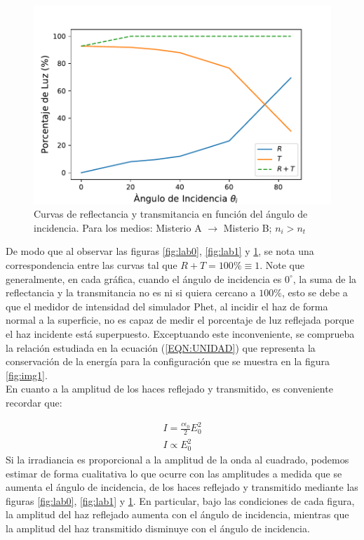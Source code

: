 \documentclass[
aps,
reprint,
amsmath, amssymb,
superscriptaddress,
]{revtex4-2}
\newcommand{\up}[1]{^{#1}}
\begin{document}
\begin{figure}
\centering
\includegraphics[width=0.9\columnwidth]{img/lab3.pdf}
\caption{\label{fig:lab2} Curvas de reflectancia y transmitancia en función del ángulo de incidencia. Para los medios: Misterio A $\rightarrow$ Misterio B; $n_i > n_t$}
\end{figure}

De modo que al observar las figuras \ref{fig:lab0}, \ref{fig:lab1} y \ref{fig:lab2}, se nota una correspondencia entre las curvas tal que $R + T = 100\% \equiv 1$. Note que generalmente, en cada gráfica, cuando el ángulo de incidencia es $0^{\circ}$, la suma de la reflectancia y la transmitancia no es ni si quiera cercano a $100\%$, esto se debe a que el medidor de intensidad del simulador Phet, al incidir el haz de forma normal a la superficie, no es capaz de medir el porcentaje de luz reflejada porque el haz incidente está superpuesto. Exceptuando este inconveniente, se comprueba la relación estudiada en la ecuación (\ref{EQN:UNIDAD}) que representa la conservación de la energía para la configuración que se muestra en la figura \ref{fig:img1}.\\

En cuanto a la amplitud de los haces reflejado y transmitido, es conveniente recordar que:

\begin{gather}
I = \frac{c \epsilon_0}{2} E_0\up{2}\\
I \propto E_0\up{2}
\end{gather}
Si la irradiancia es proporcional a la amplitud de la onda al cuadrado, podemos estimar de forma cualitativa lo que ocurre con las amplitudes a medida que se aumenta el ángulo de incidencia, de los haces reflejado y transmitido mediante las figuras \ref{fig:lab0}, \ref{fig:lab1} y \ref{fig:lab2}. En particular, bajo las condiciones de cada figura, la amplitud del haz reflejado aumenta con el ángulo de incidencia, mientras que la amplitud del haz transmitido disminuye con el ángulo de incidencia.
\end{document}
